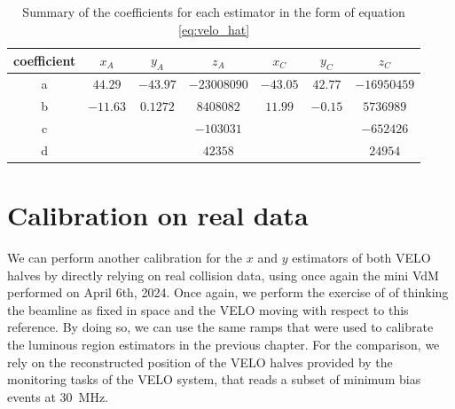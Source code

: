 \begin{table}
\centering
\begin{tabular}{c|c|c|c|c|c|c}
coefficient  & $x_A$   & $y_A$   & $z_A$      & $x_C$   & $y_C$  & $z_C$      \\\hline
a & $44.29$  & $-43.97$ &  $-23008090$    & $-43.05$ & $42.77$ &   $-16950459$   \\
b & $-11.63$ & $0.1272$ & $8408082$   & $11.99$  & $-0.15$ &  $5736989$ \\
c &        &        & $-103031$   &        &       &  $-652426 $  \\
d &        &        &  $42358$ &        &       & $24954$
\end{tabular}
\caption{Summary of the coefficients for each estimator in the form of equation \eqref{eq:velo_hat}}\label{tab:coefficients}
\end{table}

\section{Calibration on real data}
We can perform another calibration for the $x$ and $y$ estimators of both VELO halves by directly relying on real collision data, using once again the mini VdM performed on April 6th, 2024. 
Once again, we perform the exercise of of thinking the beamline as fixed in space and the VELO moving with respect to this reference. By doing so, we can use the same ramps that were used to calibrate the luminous region estimators in the previous chapter. For the comparison, we rely on the reconstructed position of the VELO halves provided by the monitoring tasks of the VELO system, that reads a subset of minimum bias events at \SI{30}{\mega\hertz}. 

